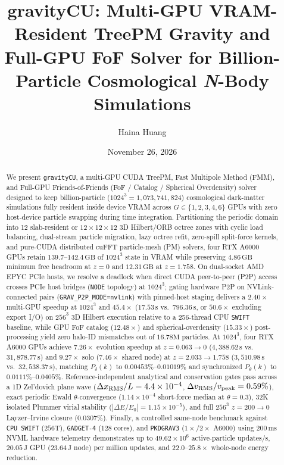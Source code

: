 \documentclass[aps,prd,reprint,superscriptaddress,nofootinbib,amsmath,amssymb,floatfix,longbibliography]{revtex4-2}
\newcommand{\manuscripttitle}{gravityCU: Multi-GPU VRAM-Resident TreePM Gravity and Full-GPU FoF Solver for Billion-Particle Cosmological \textit{N}-Body Simulations}
\begin{document}
\title{\manuscripttitle}
\author{Haina Huang}
\date{November 26, 2026}

\begin{abstract}
We present \texttt{gravityCU}, a multi-GPU CUDA TreePM, Fast Multipole Method (FMM), and Full-GPU Friends-of-Friends (FoF / Catalog / Spherical Overdensity) solver designed to keep billion-particle ($1024^3 = 1{,}073{,}741{,}824$) cosmological dark-matter simulations fully resident inside device VRAM across $G \in \{1, 2, 3, 4, 6\}$ GPUs with zero host-device particle swapping during time integration. Partitioning the periodic domain into 12 slab-resident or $12\times 12\times 12$ 3D Hilbert/ORB octree zones with cyclic load balancing, dual-stream particle migration, lazy octree refit, zero-spill split-force kernels, and pure-CUDA distributed cuFFT particle-mesh (PM) solvers, four RTX A6000 GPUs retain $139.7$--$142.4\,\mathrm{GB}$ of $1024^3$ state in VRAM while preserving $4.86\,\mathrm{GB}$ minimum free headroom at $z=0$ and $12.31\,\mathrm{GB}$ at $z=1.758$. On dual-socket AMD EPYC PCIe hosts, we resolve a deadlock when direct CUDA peer-to-peer (P2P) access crosses PCIe host bridges (\texttt{NODE} topology) at $1024^3$; gating hardware P2P on NVLink-connected pairs (\texttt{GRAV\_P2P\_MODE=nvlink}) with pinned-host staging delivers a $2.40\times$ multi-GPU speedup at $1024^3$ and $45.4\times$ ($17.53\,\mathrm{s}$ vs.\ $796.36\,\mathrm{s}$, or $50.6\times$ excluding export I/O) on $256^3$ 3D Hilbert execution relative to a 256-thread CPU \texttt{SWIFT} baseline, while GPU FoF catalog ($12.48\times$) and spherical-overdensity ($15.33\times$) post-processing yield zero halo-ID mismatches out of $16.78\mathrm{M}$ particles. At $1024^3$, four RTX A6000 GPUs achieve $7.26\times$ evolution speedup at $z = 0.063 \rightarrow 0$ ($4{,}388.62\,\mathrm{s}$ vs.\ $31{,}878.77\,\mathrm{s}$) and $9.27\times$ solo ($7.46\times$ shared node) at $z = 2.033 \rightarrow 1.758$ ($3{,}510.98\,\mathrm{s}$ vs.\ $32{,}538.37\,\mathrm{s}$), matching $P_\delta(k)$ to $0.00453\%$--$0.01019\%$ and synchronized $P_\theta(k)$ to $0.0111\%$--$0.0405\%$. Reference-independent analytical and conservation gates pass across a 1D Zel'dovich plane wave ($\Delta x_{\rm RMS}/L = 4.4\times 10^{-4}$, $\Delta v_{\rm RMS}/v_{\rm peak} = 0.59\%$), exact periodic Ewald $\theta$-convergence ($1.14\times 10^{-4}$ short-force median at $\theta=0.3$), 32K isolated Plummer virial stability ($|\Delta E/E_0| = 1.15\times 10^{-5}$), and full $256^3$ $z = 200 \rightarrow 0$ Layzer--Irvine closure ($0.0307\%$). Finally, a controlled same-node benchmark against \texttt{CPU SWIFT} ($256\mathrm{T}$), \texttt{GADGET-4} ($128$ cores), and \texttt{PKDGRAV3} ($1\times$/$2\times$ A6000) using $200\,\mathrm{ms}$ NVML hardware telemetry demonstrates up to $49.62\times 10^6$ active-particle updates/s, $20.05\,\mathrm{J}$ GPU ($23.64\,\mathrm{J}$ node) per million updates, and $22.0$--$25.8\times$ whole-node energy reduction.
\end{abstract}
\end{document}
